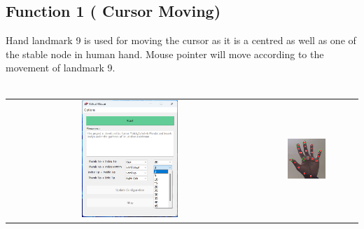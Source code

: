 \documentclass[12pt,a4paper]{report}
\begin{document}
		\subsection{Function 1 ( Cursor Moving)}
		Hand landmark 9 is used for moving the cursor as it is a centred as well as one of the stable node in human hand. Mouse pointer will move according to the movement of landmark 9.
\\ \\
		    \begin{tabular}{c c}
 \includegraphics[width=0.4\textwidth]{soptions}&
 \includegraphics[width=0.4\textwidth]{action1} 
    \end{tabular}
		\label{Function 2 ( Click )}
\end{document}

